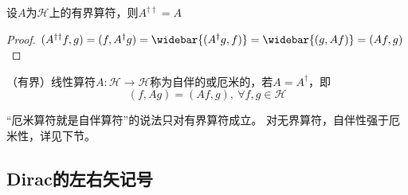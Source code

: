 \begin{theorem}
    设$A$为$\mathscr{H}$上的有界算符，则$A^{\dagger\dagger} = A$
\end{theorem}

\begin{proof}
    $(A^{\dagger\dagger}f, g) = (f, A^\dagger g) = \widebar{(A^\dagger g, f)} = \widebar{(g, Af)} = (Af, g)$
\end{proof}

\begin{definition}
    （有界）线性算符$A \colon \mathscr{H} \to \mathscr{H}$称为自伴的或厄米的，若$A = A^\dagger$，即
    $$(f, Ag) = (Af, g), ~ \forall f, g \in \mathscr{H}$$
\end{definition}

\begin{note}
    ``厄米算符就是自伴算符''的说法只对有界算符成立。
    对无界算符，自伴性强于厄米性，详见下节。
\end{note}

\subsection{Dirac的左右矢记号}

